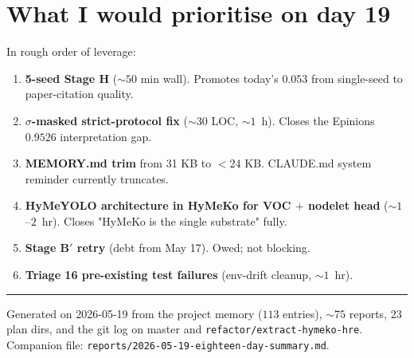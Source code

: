 \documentclass[11pt,a4paper]{article}
\newcommand{\code}[1]{\texttt{\small #1}}
\begin{document}
\section{What I would prioritise on day 19}

In rough order of leverage:

\begin{enumerate}
  \item \textbf{5-seed Stage H} (${\sim}50$ min wall). Promotes today's
        $0.053$ from single-seed to paper-citation quality.
  \item \textbf{$\sigma$-masked strict-protocol fix} ($\sim 30$ LOC,
        $\sim 1$~h). Closes the Epinions $0.9526$ interpretation gap.
  \item \textbf{MEMORY.md trim} from 31 KB to ${<}24$ KB. CLAUDE.md
        system reminder currently truncates.
  \item \textbf{HyMeYOLO architecture in HyMeKo for VOC $+$ nodelet head}
        (${\sim}1$--$2$~hr). Closes "HyMeKo is the single substrate" fully.
  \item \textbf{Stage B$'$ retry} (debt from May 17). Owed; not blocking.
  \item \textbf{Triage 16 pre-existing test failures} (env-drift cleanup, $\sim 1$~hr).
\end{enumerate}

\vspace{8pt}\hrule\vspace{4pt}
\noindent\footnotesize
Generated on 2026-05-19 from the project memory ($113$ entries),
${\sim}75$ reports, $23$ plan dirs, and the git log on master and
\code{refactor/extract-hymeko-hre}. Companion file:
\code{reports/2026-05-19-eighteen-day-summary.md}.
\end{document}

